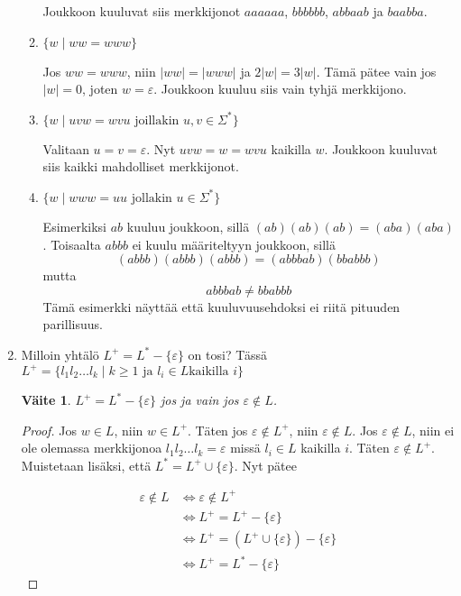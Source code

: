 \documentclass[a4paper,11pt,draft]{article}
\newtheorem*{claim}{Väite}
\begin{document}
\begin{enumerate}
\begin{enumerate}
    Joukkoon kuuluvat siis merkkijonot $aaaaaa$, $bbbbbb$, $abbaab$
    ja $baabba$.

  \item
    $\{w \mid ww = www\}$

    Jos $ww = www$, niin $|ww| = |www|$ ja $2|w| = 3|w|$.
    Tämä pätee vain jos $|w| = 0$, joten $w = \varepsilon$. Joukkoon
    kuuluu siis vain tyhjä merkkijono.

  \item
    $\{w \mid uvw = wvu \text{ joillakin } u,v \in \Sigma^*\}$

    Valitaan $u = v = \varepsilon$. Nyt $uvw = w = wvu$ kaikilla
    $w$. Joukkoon kuuluvat siis kaikki mahdolliset merkkijonot.

  \item
    $\{w \mid www = uu \text{ jollakin } u \in \Sigma^*\}$

    Esimerkiksi $ab$ kuuluu joukkoon, sillä $(ab)(ab)(ab) =
    (aba)(aba)$. Toisaalta $abbb$ ei kuulu määriteltyyn joukkoon,
    sillä
    \begin{equation*}
    (abbb)(abbb)(abbb) = (abbbab)(bbabbb)
    \end{equation*}
    mutta
    \begin{equation*}
      abbbab \neq bbabbb
    \end{equation*}
    Tämä esimerkki näyttää että kuuluvuusehdoksi ei riitä pituuden
    parillisuus.
  \end{enumerate}

\newpage
\item
  Milloin yhtälö $L^+ = L^* - \{\varepsilon\}$ on tosi? Tässä $L^+ =
  \{l_1l_2 \ldots l_k \mid k \ge 1 \text{ ja } l_i \in L \text{
    kaikilla } i\}$

  \begin{claim}
    $L^+ = L^* - \{\varepsilon\}$ jos ja vain jos $\varepsilon \notin L$.
  \end{claim}

  \begin{proof}
    Jos $w \in L$, niin $w \in L^+$. Täten jos $\varepsilon \notin
    L^+$, niin $\varepsilon \notin L$. Jos $\varepsilon \notin L$,
    niin ei ole olemassa merkkijonoa $l_1l_2 \ldots l_k =
    \varepsilon$ missä $l_i \in L$ kaikilla $i$. Täten $\varepsilon
    \notin L^+$. Muistetaan lisäksi, että $L^* = L^+ \cup
    \{\varepsilon\}$. Nyt pätee

    \begin{align*}
      \varepsilon \notin L &\Leftrightarrow \varepsilon \notin L^+ \\
      &\Leftrightarrow L^+ = L^+ - \{\varepsilon\} \\
      &\Leftrightarrow L^+ = (L^+ \cup \{\varepsilon\}) -
      \{\varepsilon\} \\
      &\Leftrightarrow L^+ = L^* - \{\varepsilon\}
    \end{align*}


\end{proof}
\end{enumerate}
\end{document}
